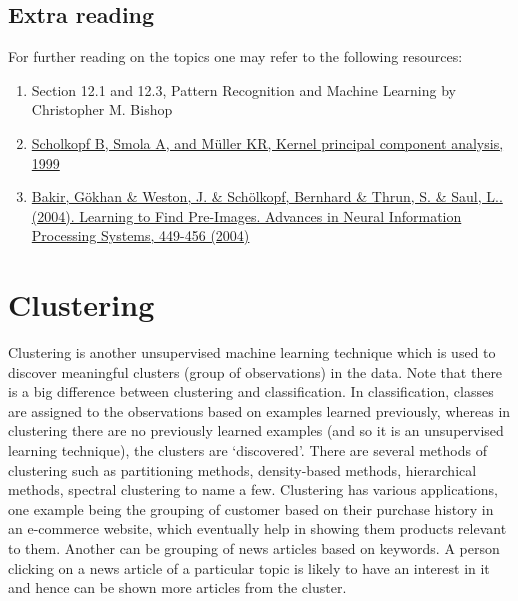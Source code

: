 \documentclass[12pt,a4paper]{article}
\begin{document}
\subsection{Extra reading}
For further reading on the topics one may refer to the following resources:
\begin{enumerate}
    \item Section 12.1 and 12.3, Pattern Recognition and Machine Learning by Christopher M. Bishop
    \item \href{https://axon.cs.byu.edu/~martinez/classes/778/Papers/KernelPCA.pdf}{Scholkopf B, Smola A, and Müller KR, Kernel principal component analysis, 1999}
    \item \href{https://www.researchgate.net/publication/41781235_Learning_to_Find_Pre-Images}{Bakir, Gökhan \& Weston, J. \& Schölkopf, Bernhard \& Thrun, S. \& Saul, L.. (2004). Learning to Find Pre-Images. Advances in Neural Information Processing Systems, 449-456 (2004)}
\end{enumerate}


\newpage
\section{Clustering}
Clustering is another unsupervised machine learning technique which is used to discover meaningful clusters (group of observations) in the data. Note that there is a big difference between clustering and classification. In classification, classes are assigned to the observations based on examples learned previously, whereas in clustering there are no previously learned examples (and so it is an unsupervised learning technique), the clusters are `discovered'. There are several methods of clustering such as partitioning methods, density-based methods, hierarchical methods, spectral clustering to name a few. Clustering has various applications, one example being the grouping of customer based on their purchase history in an e-commerce website, which eventually help in showing them products relevant to them. Another can be grouping of news articles based on keywords. A person clicking on a news article of a particular topic is likely to have an interest in it and hence can be shown more articles from the cluster.
\end{document}
